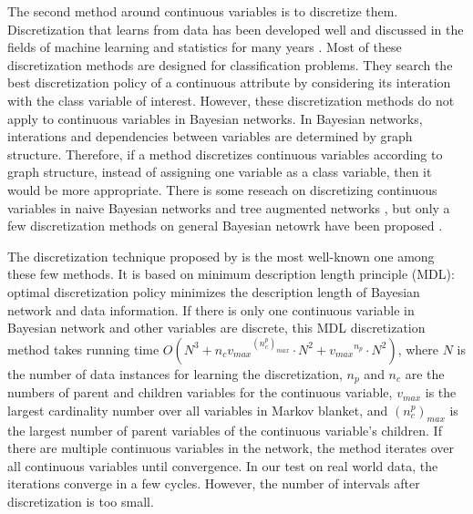 The second method around continuous variables is to discretize them. Discretization that learns from data has been developed well and discussed in the fields of machine learning and statistics for many years \citep{Dougherty_1995, Kerber_1992, Holte_1993, Fayyad_1993} . Most of these discretization methods are designed for classification problems. They search the best discretization policy of a continuous attribute by considering its interation with the class variable of interest. However, these discretization methods do not apply to continuous variables in Bayesian networks. In Bayesian networks, interations and dependencies between variables are determined by graph structure. Therefore, if a method discretizes continuous variables according to graph structure, instead of assigning one variable as a class variable, then it would be more appropriate. There is some reseach on discretizing continuous variables in naive Bayesian networks and tree augmented networks \citep{Fried_naive}, but only a few discretization methods on general Bayesian netowrk have been proposed \citep{Friedman_1996, Kozlov_1997, Monti_1998, Steck_2007}. 

The discretization technique proposed by \citet{Friedman_1996} is the most well-known one among these few methods. It is based on minimum description length principle (MDL): optimal discretization policy minimizes the description length of Bayesian network and data information. If there is only one continuous variable in Bayesian network and other variables are discrete, this MDL discretization method takes running time $O(N^3 + n_c {v_{max}}^{(n_c^p)_{max}} \cdot N^2 + {v_{max}}^{n_p} \cdot N^2)$, where $N$ is the number of data instances for learning the discretization, $n_p$ and $n_c$ are the numbers of parent and children variables for the continuous variable, $v_{max}$ is the largest cardinality number over all variables in Markov blanket, and  ${(n_c^p)_{max}}$ is the largest number of parent variables of the continuous variable's children. If there are multiple continuous variables in the network, the method iterates over all continuous variables until convergence. In our test on real world data, the iterations converge in a few cycles. However, the number of intervals after discretization is too small.

